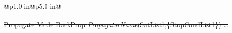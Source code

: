 \noindent {}
\tablefirsthead{\hline\hline}\label{Table:PropagateCommand}
\tabletail{\hline\hline} \tablelasttail{\hline\hline}
\begin{supertabular*}{6.5 in}{@{}p{1.0 in}@{\extracolsep{\fill}}p{5.0 in}@{}}
    \\
    \hline\\
    {\st{Propagate Mode BackProp \emph{PropagatorName}(SatList1,\{StopCondList1\}) \ldots}}\\
    \\\\


\end{supertabular*}
